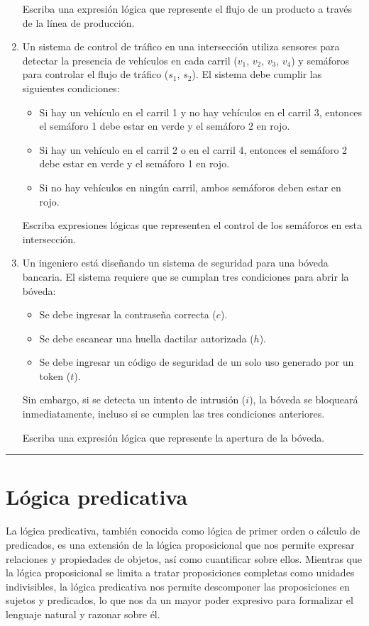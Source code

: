 \begin{enumerate}[label=\textbf{\arabic*}.]
	Escriba una expresión lógica que represente el flujo de un producto a través de la línea de producción.
	
	\item Un sistema de control de tráfico en una intersección utiliza sensores para detectar la presencia de vehículos en cada carril ($v_1$, $v_2$, $v_3$, $v_4$) y semáforos para controlar el flujo de tráfico ($s_1$, $s_2$). El sistema debe cumplir las siguientes condiciones:
	\begin{itemize}[itemsep=-3pt]
		\item Si hay un vehículo en el carril 1 y no hay vehículos en el carril 3, entonces el semáforo 1 debe estar en verde y el semáforo 2 en rojo.
		\item Si hay un vehículo en el carril 2 o en el carril 4, entonces el semáforo 2 debe estar en verde y el semáforo 1 en rojo.
		\item Si no hay vehículos en ningún carril, ambos semáforos deben estar en rojo.
	\end{itemize}
	
	Escriba expresiones lógicas que representen el control de los semáforos en esta intersección.
	
	\item Un ingeniero está diseñando un sistema de seguridad para una bóveda bancaria. El sistema requiere que se cumplan tres condiciones para abrir la bóveda:
	
	\begin{itemize}[itemsep=-3pt]
		\item Se debe ingresar la contraseña correcta ($c$).
		\item Se debe escanear una huella dactilar autorizada ($h$).
		\item Se debe ingresar un código de seguridad de un solo uso generado por un token ($t$).
	\end{itemize}	
	Sin embargo, si se detecta un intento de intrusión ($i$), la bóveda se bloqueará inmediatamente, incluso si se cumplen las tres condiciones anteriores.
	
	Escriba una expresión lógica que represente la apertura de la bóveda.
\end{enumerate}

\rule{\textwidth}{.5pt}

\section{Lógica predicativa}
La lógica predicativa, también conocida como lógica de primer orden o cálculo de predicados, es una extensión de la lógica proposicional que nos permite expresar relaciones y propiedades de objetos, así como cuantificar sobre ellos. Mientras que la lógica proposicional se limita a tratar proposiciones completas como unidades indivisibles, la lógica predicativa nos permite descomponer las proposiciones en sujetos y predicados, lo que nos da un mayor poder expresivo para formalizar el lenguaje natural y razonar sobre él.


